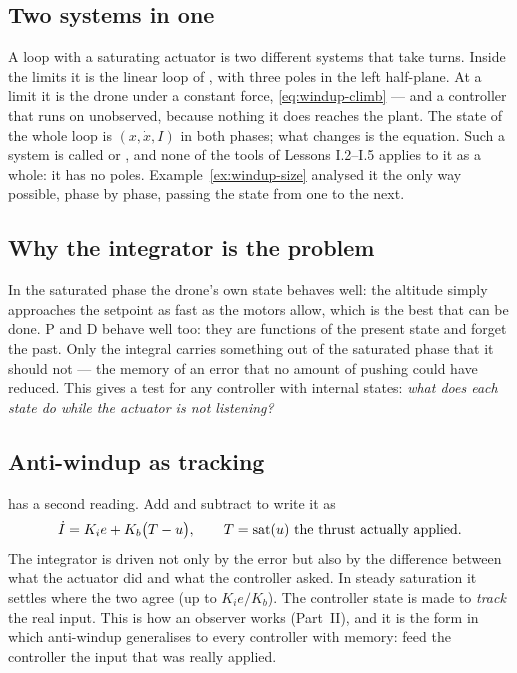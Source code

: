 \subsection{Two systems in one}
A loop with a saturating actuator is two different systems that take turns. Inside the limits it is the linear loop of , with three poles in the left half-plane. At a limit it is the drone under a constant force, \cref{eq:windup-climb} — and a controller that runs on unobserved, because nothing it does reaches the plant. The state of the whole loop is $(x, \dot x, I)$ in both phases; what changes is the equation. Such a system is called  or , and none of the tools of Lessons I.2–I.5 applies to it as a whole: it has no poles. Example~\ref{ex:windup-size} analysed it the only way possible, phase by phase, passing the state from one to the next.

\subsection{Why the integrator is the problem}
In the saturated phase the drone's own state behaves well: the altitude simply approaches the setpoint as fast as the motors allow, which is the best that can be done. P and D behave well too: they are functions of the present state and forget the past. Only the integral carries something out of the saturated phase that it should not — the memory of an error that no amount of pushing could have reduced. This gives a test for any controller with internal states: \emph{what does each state do while the actuator is not listening?}

\subsection{Anti-windup as tracking}
 has a second reading. Add and subtract to write it as
\begin{equation}
  \dot I = K_i e + K_b\big(T - u\big), \qquad T = \operatorname{sat}(u) \ \text{the thrust actually applied.}
\end{equation}
The integrator is driven not only by the error but also by the difference between what the actuator did and what the controller asked. In steady saturation it settles where the two agree (up to $K_ie/K_b$). The controller state is made to \emph{track} the real input. This is how an observer works (Part~II), and it is the form in which anti-windup generalises to every controller with memory: feed the controller the input that was really applied.

